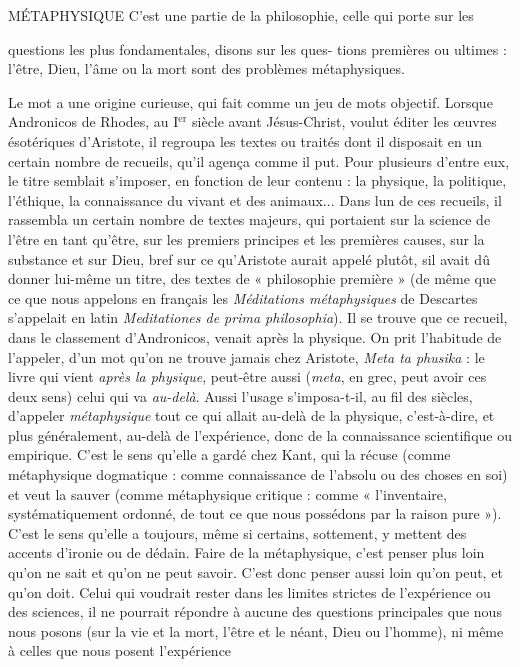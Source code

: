 MÉTAPHYSIQUE C’est une partie de la philosophie, celle qui porte sur les

questions les plus fondamentales, disons sur les ques-
tions premières ou ultimes : l’être, Dieu, l’âme ou la mort sont des problèmes
métaphysiques.

Le mot a une origine curieuse, qui fait comme un jeu de mots objectif.
Lorsque Andronicos de Rhodes, au {\footnotesize I$^\text{er}$} siècle avant Jésus-Christ, voulut éditer les
œuvres ésotériques d’Aristote, il regroupa les textes ou traités dont il disposait
en un certain nombre de recueils, qu’il agença comme il put. Pour plusieurs
d’entre eux, le titre semblait s'imposer, en fonction de leur contenu : la physique,
la politique, l'éthique, la connaissance du vivant et des animaux... Dans
lun de ces recueils, il rassembla un certain nombre de textes majeurs, qui portaient
sur la science de l’être en tant qu'être, sur les premiers principes et les
premières causes, sur la substance et sur Dieu, bref sur ce qu’Aristote aurait
appelé plutôt, sil avait dû donner lui-même un titre, des textes de
« philosophie première » (de même que ce que nous appelons en français les
{\it Méditations métaphysiques} de Descartes s’appelait en latin {\it Meditationes de prima
philosophia}). Il se trouve que ce recueil, dans le classement d’Andronicos, venait
après la physique. On prit l'habitude de l’appeler, d’un mot qu’on ne trouve
jamais chez Aristote, {\it Meta ta phusika} : le livre qui vient {\it après la physique}, peut-être
aussi ({\it meta}, en grec, peut avoir ces deux sens) celui qui va {\it au-delà}. Aussi
l'usage s’imposa-t-il, au fil des siècles, d'appeler {\it métaphysique} tout ce qui allait
au-delà de la physique, c’est-à-dire, et plus généralement, au-delà de l’expérience,
donc de la connaissance scientifique ou empirique. C’est le sens qu’elle
a gardé chez Kant, qui la récuse (comme métaphysique dogmatique : comme
connaissance de l’absolu ou des choses en soi) et veut la sauver (comme métaphysique
critique : comme « l’inventaire, systématiquement ordonné, de tout
ce que nous possédons par la raison pure »). C’est le sens qu’elle a toujours,
même si certains, sottement, y mettent des accents d’ironie ou de dédain. Faire
de la métaphysique, c’est penser plus loin qu’on ne sait et qu’on ne peut savoir.
C’est donc penser aussi loin qu’on peut, et qu’on doit. Celui qui voudrait rester
dans les limites strictes de l'expérience ou des sciences, il ne pourrait répondre
à aucune des questions principales que nous nous posons (sur la vie et la mort,
l'être et le néant, Dieu ou l’homme), ni même à celles que nous posent l’expérience
